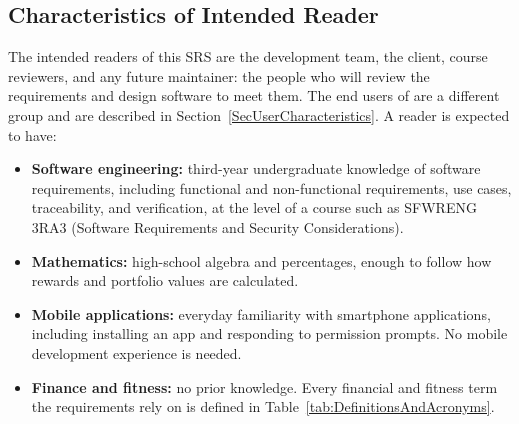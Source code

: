 \documentclass[12pt]{article}
\begin{document}
\subsection{Characteristics of Intended Reader} \label{sec_IntendedReader}




The intended readers of this SRS are the \progname{} development team, the
client, course reviewers, and any future maintainer: the people who will
review the requirements and design software to meet them. The end users of
\progname{} are a different group and are described in
Section~\ref{SecUserCharacteristics}. A reader is expected to have:

\begin{itemize}
  \item \textbf{Software engineering:} third-year undergraduate knowledge of
        software requirements, including functional and non-functional requirements,
        use cases, traceability, and verification, at the level of a course such as
        SFWRENG 3RA3 (Software Requirements and Security Considerations).
  \item \textbf{Mathematics:} high-school algebra and percentages, enough to
        follow how rewards and portfolio values are calculated.
  \item \textbf{Mobile applications:} everyday familiarity with smartphone
        applications, including installing an app and responding to permission
        prompts. No mobile development experience is needed.
  \item \textbf{Finance and fitness:} no prior knowledge. Every financial and
        fitness term the requirements rely on is defined in
        Table~\ref{tab:DefinitionsAndAcronyms}.
\end{itemize}
\end{document}
